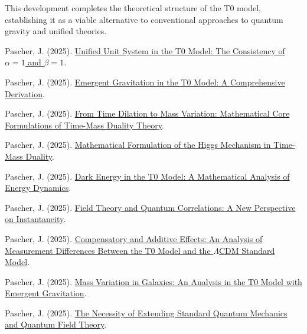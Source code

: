 \documentclass[12pt,a4paper]{article}
\begin{document}
	This development completes the theoretical structure of the T0 model, establishing it as a viable alternative to conventional approaches to quantum gravity and unified theories.
	
	\begin{thebibliography}{99}
		 Pascher, J. (2025). \href{https://github.com/jpascher/T0-Time-Mass-Duality/tree/main/2/pdf/English/Alpha1Beta1KonsistenzEn.pdf}{Unified Unit System in the T0 Model: The Consistency of $\alpha = 1$ and $\beta = 1$}.
		
		 Pascher, J. (2025). \href{https://github.com/jpascher/T0-Time-Mass-Duality/tree/main/2/pdf/English/EmergentGravT0En.pdf}{Emergent Gravitation in the T0 Model: A Comprehensive Derivation}.
		
		 Pascher, J. (2025). \href{https://github.com/jpascher/T0-Time-Mass-Duality/tree/main/2/pdf/English/MathZeitMasseLagrangeEn.pdf}{From Time Dilation to Mass Variation: Mathematical Core Formulations of Time-Mass Duality Theory}.
		
		 Pascher, J. (2025). \href{https://github.com/jpascher/T0-Time-Mass-Duality/tree/main/2/pdf/English/MathHiggsZeitMasseEn.pdf}{Mathematical Formulation of the Higgs Mechanism in Time-Mass Duality}.
		
		 Pascher, J. (2025). \href{https://github.com/jpascher/T0-Time-Mass-Duality/tree/main/2/pdf/English/MathEnergiedynamikEn.pdf}{Dark Energy in the T0 Model: A Mathematical Analysis of Energy Dynamics}.
		
		 Pascher, J. (2025). \href{https://github.com/jpascher/T0-Time-Mass-Duality/tree/main/2/pdf/English/FeldtheorieQuantenEn.pdf}{Field Theory and Quantum Correlations: A New Perspective on Instantaneity}.
		
		 Pascher, J. (2025). \href{https://github.com/jpascher/T0-Time-Mass-Duality/tree/main/2/pdf/English/MessdifferenzenT0StandardEn.pdf}{Compensatory and Additive Effects: An Analysis of Measurement Differences Between the T0 Model and the $\Lambda$CDM Standard Model}.
		
		 Pascher, J. (2025). \href{https://github.com/jpascher/T0-Time-Mass-Duality/tree/main/2/pdf/English/MassVarGalaxienEn.pdf}{Mass Variation in Galaxies: An Analysis in the T0 Model with Emergent Gravitation}.
		
		 Pascher, J. (2025). \href{https://github.com/jpascher/T0-Time-Mass-Duality/tree/main/2/pdf/English/NotwendigkeitQMErweiterungEn.pdf}{The Necessity of Extending Standard Quantum Mechanics and Quantum Field Theory}.
		

\end{thebibliography}
\end{document}
